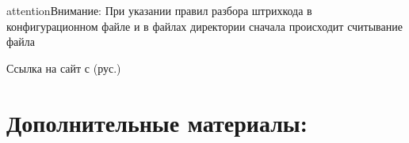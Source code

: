 \documentclass[a4paper,10pt,russian]{report}
\begin{document}
\begin{sphinxadmonition}{attention}{Внимание:}
\sphinxAtStartPar
При указании правил разбора штрих\sphinxhyphen{}кода в конфигурационном файле 
и в файлах директории 
сначала происходит считывание файла 
\end{sphinxadmonition}

\sphinxAtStartPar
Ссылка на сайт с  (рус.)

\sphinxstepscope


\chapter{Дополнительные материалы:}
\label{\detokenize{additional:id1}}\label{\detokenize{additional::doc}}
\end{document}
